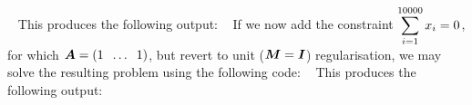 \documentclass{galahad}
\begin{document}
{\tt \small
\VerbatimInput{\packageexample}
}
\noindent
This produces the following output:
{\tt \small
\VerbatimInput{\packageresults}
}
If we now add the constraint $\displaystyle \sum_{i=1}^{10000} x_i = 0$,
for which ${\bm{A}} = ( 1 \;\; \ldots \;\; 1 )$, but revert to unit
(${\bm{M}} = {\bm{I}}$) regularisation, we may solve the
resulting problem using the following code:
{\tt \small
\VerbatimInput{\packageexampleb}
}
\noindent
This produces the following output:
{\tt \small
\VerbatimInput{\packageresultsb}
}
\end{document}
